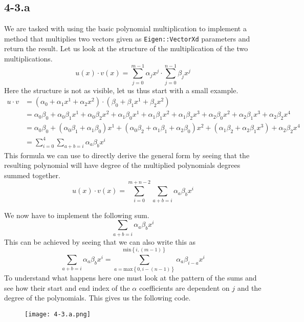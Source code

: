 \documentclass{article}
\begin{document}
\subsection*{4-3.a}
We are tasked with using the basic polynomial multiplication to implement a method that multiplies two vectors given as \verb|Eigen::VectorXd| parameters and return the result. Let us look at the structure of the multiplication of the two multiplications.
\begin{equation*}
    u\left(x\right)\cdot v\left(x\right) = \sum_{j=0}^{m-1}\alpha_{j}x^{j}\cdot \sum_{j=0}^{n-1}\beta_{j}x^{j}
\end{equation*}
Here the structure is not as visible, let us thus start with a small example.
\begin{align*}
    u \cdot v &= 
    \left(\alpha_{0} + \alpha_{1}x^{1} + \alpha_{2}x^{2}\right) \cdot \left(\beta_{0} + \beta_{1}x^{1} + \beta_{2}x^{2}\right) \\&= \alpha_{0}\beta_{0} + \alpha_{0}\beta_{1}x^{1} + \alpha_{0}\beta_{2}x^{2} + \alpha_{1}\beta_{0}x^{1} + \alpha_{1}\beta_{1}x^{2} + \alpha_{1}\beta_{2}x^{3} + \alpha_{2}\beta_{0}x^{2} + \alpha_{2}\beta_{1}x^{3} + \alpha_{2}\beta_{2}x^{4} \\
    &= \alpha_{0}\beta_{0} + \left(\alpha_{0}\beta_{1} + \alpha_{1}\beta_{0}\right)x^{1} + \left(\alpha_{0}\beta_{2} + \alpha_{1}\beta_{1} + \alpha_{2}\beta_{0}\right)x^{2} + \left(\alpha_{1}\beta_{2} + \alpha_{2}\beta_{1}x^{3}\right) + \alpha_{2}\beta_{2}x^{4} \\
    &= \sum_{i=0}^{4}\sum_{a + b = i}\alpha_{a}\beta_{b}x^{i}
\end{align*}
This formula we can use to directly derive the general form by seeing that the resulting polynomial will have degree of the multiplied polynomials degrees summed together.
\begin{equation}
     u\left(x\right)\cdot v\left(x\right) = \sum_{i=0}^{m + n - 2}\sum_{a+b=i}\alpha_{a}\beta_{b}x^{i}
\end{equation} 

\pagebreak

\noindent We now have to implement the following sum.
\begin{equation*} \sum_{a+b=i}\alpha_{a}\beta_{b}x^{i}
\end{equation*}
This can be achieved by seeing that we can also write this as 
\begin{equation*}
    \sum_{a+b=i}\alpha_{a}\beta_{b}x^{i} = \sum_{a = \text{max}\left\{ 0,i -\left(n-1\right)\right\}}^{\text{min}\left\{i, \left(m-1\right)\right\}}\alpha_{a}\beta_{i - a}x^{i}
\end{equation*}
To understand what happens here one must look at the pattern of the sums and see how their start and end index of the $\alpha$ coefficients are dependent on $j$ and the degree of the polynomials. This gives us the following code.
\begin{figure}[!hbt]
    \centering
\texttt{[image: 4-3.a.png]}
\end{figure}
\end{document}
